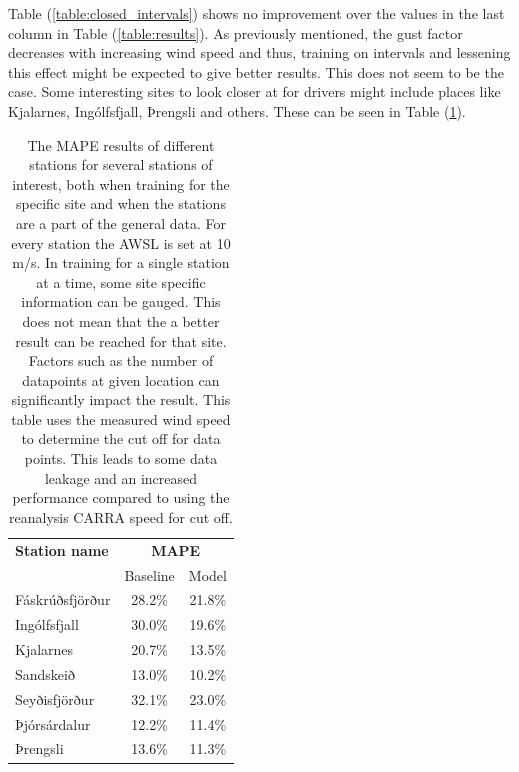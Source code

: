 Table (\ref{table:closed_intervals}) shows no improvement over the values in the last column in Table (\ref{table:results}). As previously mentioned, the gust factor decreases with increasing wind speed and thus, training on intervals and lessening this effect might be expected to give better results. This does not seem to be the case. Some interesting sites to look closer at for drivers might include places like Kjalarnes, Ingólfsfjall, Þrengsli and others. These can be seen in Table (\ref{table:specific_sites}).

\begin{table}[h]
    \caption[Model result by stations of interest]{The MAPE results of different stations for several stations of interest, both when training for the specific site and when the stations are a part of the general data. For every station the AWSL is set at 10 m/s. In training for a single station at a time, some site specific information can be gauged. This does not mean that the a better result can be reached for that site. Factors such as the number of datapoints at given location can significantly impact the result. This table uses the measured wind speed to determine the cut off for data points. This leads to some data leakage and an increased performance compared to using the reanalysis CARRA speed for cut off.}
    \label{table:specific_sites}
    \centering
    \begin{tabular}{l | cc}
        \toprule
        \textbf{Station name} & \multicolumn{2}{c}{\textbf{MAPE}}\\
         & Baseline & Model\\
         \midrule
        Fáskrúðsfjörður & 28.2\% & 21.8\%\\
        Ingólfsfjall & 30.0\% & 19.6\%\\
        Kjalarnes & 20.7\% & 13.5\% \\
        Sandskeið & 13.0\% & 10.2\%\\
        Seyðisfjörður & 32.1\% & 23.0\%\\
        Þjórsárdalur & 12.2\% & 11.4\%\\
        Þrengsli & 13.6\% & 11.3\%\\
        \bottomrule
    \end{tabular}
\end{table}


